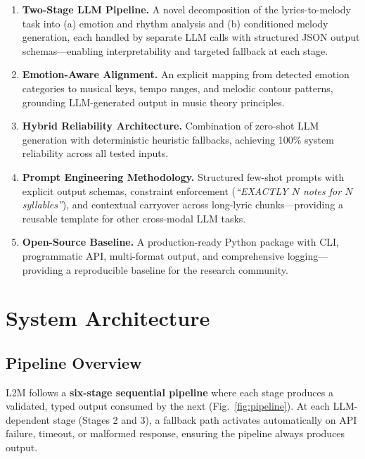 \documentclass[conference]{IEEEtran}
\begin{document}
\begin{enumerate}
  \item \textbf{Two-Stage LLM Pipeline.} A novel decomposition of the
        lyrics-to-melody task into (a) emotion and rhythm analysis and (b)
        conditioned melody generation, each handled by separate LLM calls with
        structured JSON output schemas---enabling interpretability and targeted
        fallback at each stage.

  \item \textbf{Emotion-Aware Alignment.} An explicit mapping from detected
        emotion categories to musical keys, tempo ranges, and melodic contour
        patterns, grounding LLM-generated output in music theory principles.

  \item \textbf{Hybrid Reliability Architecture.} Combination of zero-shot LLM
        generation with deterministic heuristic fallbacks, achieving 100\%
        system reliability across all tested inputs.

  \item \textbf{Prompt Engineering Methodology.} Structured few-shot prompts
        with explicit output schemas, constraint enforcement (\textit{``EXACTLY
        $N$ notes for $N$ syllables''}), and contextual carryover across
        long-lyric chunks---providing a reusable template for other cross-modal
        LLM tasks.

  \item \textbf{Open-Source Baseline.} A production-ready Python package with
        CLI, programmatic API, multi-format output, and comprehensive
        logging---providing a reproducible baseline for the research community.
\end{enumerate}

\section{System Architecture}

\subsection{Pipeline Overview}

L2M follows a \textbf{six-stage sequential pipeline} where each stage produces
a validated, typed output consumed by the next (Fig.~\ref{fig:pipeline}). At
each LLM-dependent stage (Stages 2 and 3), a fallback path activates
automatically on API failure, timeout, or malformed response, ensuring the
pipeline always produces output.
\end{document}
